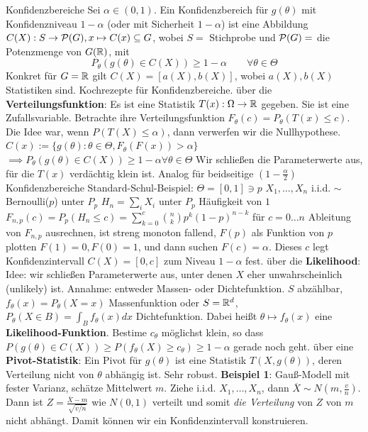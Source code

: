 \begin{outline}
    \1 Konfidenzbereiche
        \2 Sei $\alpha\in(0,1)$. Ein Konfidenzbereich für $g(\theta)$ mit Konfidenzniveau $1-\alpha$ (oder mit Sicherheit $1-\alpha$) ist eine Abbildung $C(X):S\rightarrow \mathcal{P}(G), x\mapsto C(x)\subseteq G$, wobei $S = $ Stichprobe und $\mathcal{P}(G) =$ die Potenzmenge von $G (\mathbb{R})$, mit 
        $$P_\theta(g(\theta)\in C(X)) \geq 1-\alpha \qquad \forall \theta \in \Theta$$
        \2 Konkret für $G=\mathbb{R}$ gilt $C(X)=[a(X),b(X)]$, wobei $a(X),b(X)$ Statistiken sind.
\0 Kochrezepte für Konfidenzbereiche.
    \1 über die \textbf{Verteilungsfunktion}:
        \2 Es ist eine Statistik $T(x):\Omega\rightarrow\mathbb{R}$ gegeben. Sie ist eine Zufallsvariable. Betrachte ihre Verteilungsfunktion $F_\theta (c) = P_\theta(T(x)\leq c)$. Die Idee war, wenn $P(T(X)\leq\alpha)$, dann verwerfen wir die Nullhypothese.
        \2 $C(x):=\{g(\theta): \theta \in \Theta, F_\theta (F(x)) > \alpha \}$\\ $\implies P_\theta (g(\theta) \in C(X) ) \geq 1-\alpha \forall \theta\in\Theta$
        \2 Wir schließen die Parameterwerte aus, für die $T(x)$ verdächtig klein ist.
        \2 Analog für beidseitige $(1-\frac{\alpha}{2})$ Konfidenzbereiche
    \1 Standard-Schul-Beispiel: $\Theta=[0,1] \ni p$
        \2 $X_1,\ldots, X_n$ i.i.d. $\sim$ Bernoulli($p$) unter $P_p$
        \2 $H_n=\sum_i X_i$ unter $P_p$ Häufigkeit von $1$
        \2 $F_{n,p}(c)=P_p(H_n \leq c) = \sum^c_{k=0}\binom{n}{k}p^k(1-p)^{n-k}$ für $c=0\ldots n$  
        \2 Ableitung von $F_{n,p}$ ausrechnen, ist streng monoton fallend, $F(p)$ als Funktion von $p$ plotten $F(1)=0, F(0)=1$, und dann suchen $F(c)=\alpha$. Dieses $c$ legt Konfidenzintervall $C(X)=[0,c]$ zum Niveau $1-\alpha$ fest.
    \1 über die \textbf{Likelihood}:
        \2 Idee: wir schließen Parameterwerte aus, unter denen $X$ eher unwahrscheinlich (unlikely) ist. 
        \2 Annahme: entweder Massen- oder Dichtefunktion. $S$ abzählbar, $f_\theta(x)=P_\theta(X=x)$ Massenfunktion oder $S=\mathbb{R}^d$, $P_\theta(X\in B)=\int_B f_\theta(x)dx$ Dichtefunktion. Dabei heißt $\theta \mapsto f_\theta(x)$ eine \textbf{Likelihood-Funktion}.
        \2 Bestime $c_\theta$ möglichst klein, so dass $P(g(\theta)\in C(X)) \geq P(f_\theta(X) \geq c_\theta) \geq 1-\alpha$ gerade noch geht.
    \1 über eine \textbf{Pivot-Statistik}:
        \2 Ein Pivot für $g(\theta)$ ist eine Statistik $T(X,g(\theta))$, deren Verteilung nicht von $\theta$ abhängig ist. Sehr robust.
        \2 \textbf{Beispiel 1}: Gauß-Modell mit fester Varianz, schätze Mittelwert $m$.
        \2 Ziehe i.i.d. $X_1, \ldots, X_n$, dann $\overline{X}\sim N(m,\frac{v}{n})$. Dann ist $Z=\frac{\overline{X}-m}{\sqrt{v/n}}$ wie $N(0,1)$ verteilt und somit \textit{die Verteilung} von $Z$ von $m$ nicht abhängt. Damit können wir ein Konfidenzintervall konstruieren.


\end{outline}
